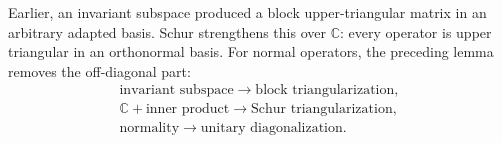 \begin{remark}
Earlier, an invariant subspace produced a block upper-triangular matrix in an
arbitrary adapted basis. Schur strengthens this over \(\mathbb C\): every
operator is upper triangular in an orthonormal basis. For normal operators,
the preceding lemma removes the off-diagonal part:
\[
\begin{array}{c}
\text{invariant subspace}\longrightarrow\text{block triangularization},\\
\mathbb C+\text{inner product}\longrightarrow\text{Schur triangularization},\\
\text{normality}\longrightarrow\text{unitary diagonalization}.
\end{array}
\]
\end{remark}

